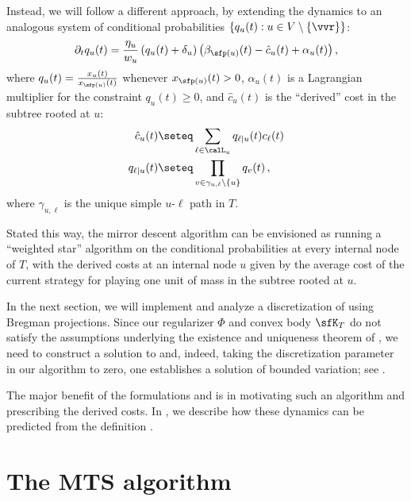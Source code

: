 Instead, we will follow a different approach, by extending the dynamics
to an analogous system of conditional probabilities
$\{q_u(t) : u \in V \setminus \{\vvr\}\}$:
\begin{equation}\label{eq:star-dynamics}
\partial_t q_u(t) = \frac{\eta_u}{w_u} \left(q_u(t)+\delta_u\right) \left(\beta_{\sfp(u)}(t) - \hat{c}_u(t) + \alpha_u(t)\right),
\end{equation}
where $q_u(t) = \frac{x_u(t)}{x_{\sfp(u)}(t)}$ whenever $x_{\sfp(u)}(t) > 0$, $\alpha_u(t)$ is a Lagrangian multiplier for the constraint $q_u(t)\ge 0$, and $\hat{c}_u(t)$ is the ``derived'' cost
in the subtree rooted at $u$:
\begin{align*}
\hat{c}_u(t) &\seteq \sum_{\ell \in \calL_u} q_{\ell\mid u}(t) c_{\ell}(t)\\
q_{\ell \mid u}(t) &\seteq \prod_{v \in \gamma_{u,\ell} \setminus \{u\}} q_v(t)\,,\nonumber
\end{align*}
where $\gamma_{u,\ell}$ is the unique simple $u$-$\ell$ path in $T$.

Stated this way, the mirror descent algorithm can be envisioned as
running a ``weighted star'' algorithm on the conditional
probabilities at every internal node of $T$, with the derived
costs at an internal node $u$ given by the average cost of the current strategy
for playing one unit of mass in the subtree rooted at $u$.

In the next section, we will implement and analyze a discretization of 
using Bregman projections.
Since our regularizer $\Phi$ and convex body $\sfK_T$ do not satisfy
the assumptions underlying the existence and uniqueness theorem of \cite{BCLLM18},
we need to construct a solution to 
and, indeed, taking the discretization parameter in our algorithm to zero,
one establishes a solution of bounded variation; see .

The major benefit of the formulations  and 
is in motivating such an algorithm and prescribing the derived costs.
In , we describe how these dynamics
can be predicted from the definition .



\section{The MTS algorithm}\label{sec:main}

